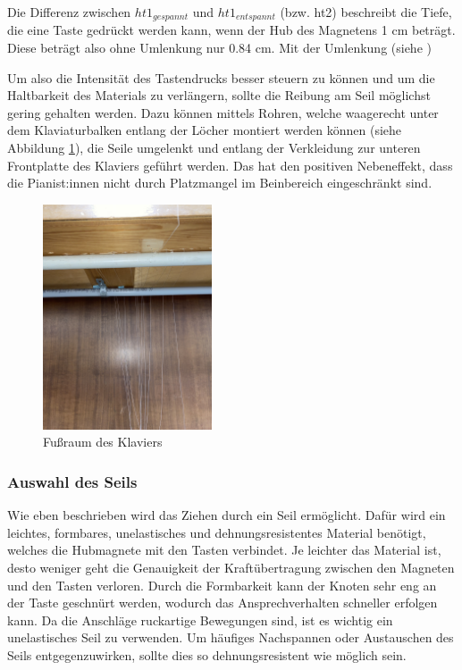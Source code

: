 Die Differenz zwischen $ht1_{gespannt}$ und $ht1_{entspannt}$ (bzw. ht2) beschreibt die Tiefe,
die eine Taste gedrückt werden kann, wenn der Hub des Magnetens 1 cm beträgt.
\newline Diese beträgt also ohne Umlenkung nur 0.84 cm.
Mit der Umlenkung (siehe )

Um also die Intensität des Tastendrucks besser steuern zu können und um die Haltbarkeit des Materials zu verlängern,
sollte die Reibung am Seil möglichst gering gehalten werden.
Dazu können mittels Rohren, welche waagerecht unter dem Klaviaturbalken entlang der Löcher montiert werden können (siehe Abbildung \ref{fig:fussraum}), die Seile umgelenkt und
entlang der Verkleidung zur unteren Frontplatte des Klaviers geführt werden.
Das hat den positiven Nebeneffekt, dass die Pianist:innen nicht durch Platzmangel im Beinbereich eingeschränkt sind.


\begin{figure}[htbp]
    \centering
    \includegraphics[width=5cm,angle=-90]{img/Fussraum.jpg}
    \caption{Fußraum des Klaviers}
    \label{fig:fussraum}
\end{figure}


\subsubsection{Auswahl des Seils}

Wie eben beschrieben wird das Ziehen durch ein Seil ermöglicht.
Dafür wird ein leichtes, formbares, unelastisches und dehnungsresistentes Material benötigt, welches die Hubmagnete mit den Tasten verbindet.
Je leichter das Material ist, desto weniger geht die Genauigkeit der Kraftübertragung zwischen den Magneten und den Tasten verloren.
Durch die Formbarkeit kann der Knoten sehr eng an der Taste geschnürt werden, wodurch das Ansprechverhalten schneller erfolgen kann.
Da die Anschläge ruckartige Bewegungen sind, ist es wichtig ein unelastisches Seil zu verwenden.
Um häufiges Nachspannen oder Austauschen des Seils entgegenzuwirken, sollte dies so dehnungsresistent wie möglich sein.

